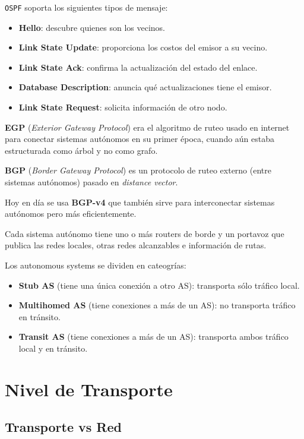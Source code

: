 \documentclass[]{article}
\begin{document}
\texttt{OSPF} soporta los siguientes tipos de mensaje:
\begin{itemize}
    \item \textbf{Hello}: descubre quienes son los vecinos.
    \item \textbf{Link State Update}: proporciona los costos del emisor a su vecino.
    \item \textbf{Link State Ack}: confirma la actualización del estado del enlace.
    \item \textbf{Database Description}: anuncia qué actualizaciones tiene el emisor.
    \item \textbf{Link State Request}: solicita información de otro nodo.
\end{itemize}


\textbf{EGP} (\emph{Exterior Gateway Protocol}) era el algoritmo de ruteo usado en internet para conectar sistemas autónomos en su primer época, cuando aún estaba estructurada como árbol y no como grafo.

\textbf{BGP} (\emph{Border Gateway Protocol}) es un protocolo de ruteo externo (entre sistemas autónomos) pasado en \emph{distance vector}.


Hoy en día se usa \textbf{BGP-v4} que también sirve para interconectar sistemas autónomos pero más eficientemente.

Cada sistema autónomo tiene uno o más routers de borde y un portavoz que publica las redes locales, otras redes alcanzables e información de rutas.

Los autonomous systems se dividen en cateogrías:
\begin{itemize}
    \item \textbf{Stub AS} (tiene una única conexión a otro AS): transporta sólo tráfico local.
    \item \textbf{Multihomed AS} (tiene conexiones a más de un AS): no transporta tráfico en tránsito.
    \item \textbf{Transit AS} (tiene conexiones a más de un AS): transporta ambos tráfico local y en tránsito.
\end{itemize}


\section{Nivel de Transporte}
\subsection{Transporte vs Red}
\end{document}
